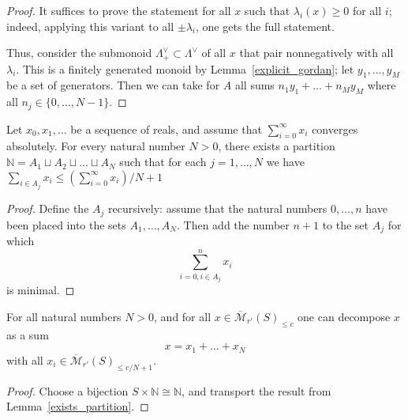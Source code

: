 \begin{proof}
  \leanok
  It suffices to prove the statement for all $x$ such that $\lambda_i(x)\geq 0$ for all $i$;
  indeed, applying this variant to all $\pm \lambda_i$, one gets the full statement.

  Thus, consider the submonoid $\Lambda^\vee_+\subset \Lambda^\vee$
  of all $x$ that pair nonnegatively with all $\lambda_i$.
  This is a finitely generated monoid by Lemma~\ref{explicit_gordan};
  let $y_1,\ldots,y_M$ be a set of generators.
  Then we can take for $A$ all sums $n_1y_1+\ldots+n_My_M$ where all $n_j\in \{0,\ldots,N-1\}$.
\end{proof}

\begin{lemma}
  \label{exists_partition}
  \leanok
  Let $x_0, x_1, \dots$ be a sequence of reals,
  and assume that $\sum_{i=0}^\infty x_i$ converges absolutely.
  For every natural number $N > 0$,
  there exists a partition $\mathbb N = A_1 \sqcup A_2 \sqcup \dots \sqcup A_N$
  such that for each $j = 1,\dots,N$ we have
  $\sum_{i \in A_j} x_i \le (\sum_{i=0}^\infty x_i)/N + 1$
\end{lemma}

\begin{proof}
  \leanok
  Define the $A_j$ recursively:
  assume that the natural numbers $0, \dots, n$
  have been placed into the sets $A_1, \dots, A_N$.
  Then add the number $n+1$ to the set $A_j$ for which
  \[
    \sum_{i=0, i\in A_j}^n x_i
  \]
  is minimal.
\end{proof}

\begin{lemma}
  \label{lem98_int}
  \leanok
  For all natural numbers $N > 0$,
  and for all $x\in \overline{\mathcal M}_{r'}(S)_{\leq c}$
  one can decompose $x$ as a sum
  \[
    x=x_1+\ldots+x_N
  \]
  with all $x_i\in \overline{\mathcal M}_{r'}(S)_{\leq c/N+1}$.
\end{lemma}

\begin{proof}
  \leanok
  Choose a bijection $S \times \mathbb N \cong \mathbb N$,
  and transport the result from Lemma~\ref{exists_partition}.
\end{proof}

